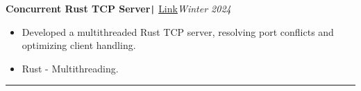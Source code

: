 \documentclass[11pt,a4paper]{article}
\begin{document}
\vspace{-0.3cm}
\begin{flushleft}
\textbf{Concurrent Rust TCP Server}\texttt{|} {\href{https://github.com/salah0eldin/RustTCPServer}{Link}}\hfill\textit{Winter 2024}\\
\end{flushleft}
\vspace{-0.6cm}
\begin{itemize}
\item \setlength{\itemsep}{-0.0em} Developed a multithreaded Rust TCP server, resolving port conflicts and optimizing client handling.
\item \setlength{\itemsep}{-0.0em} Rust - Multithreading.
\end{itemize}
\vspace{-0.3cm}
\vspace{-0.2cm}
\rule{\textwidth}{0.3pt}\\
\newpage
\vspace{-0.5cm}
\centering
\end{document}
